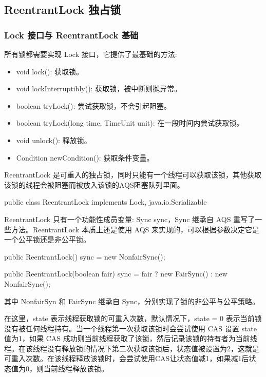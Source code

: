 \subsection{ReentrantLock 独占锁}

\subsubsection*{Lock 接口与 ReentrantLock 基础}

所有锁都需要实现 Lock 接口，它提供了最基础的方法:
\begin{itemize}
    \item void lock(): 获取锁。
    \item void lockInterruptibly(): 获取锁，被中断则抛异常。
    \item boolean tryLock(): 尝试获取锁，不会引起阻塞。
    \item boolean tryLock(long time, TimeUnit unit): 在一段时间内尝试获取锁。
    \item void unlock(): 释放锁。
    \item Condition newCondition(): 获取条件变量。
\end{itemize}

ReentrantLock 是可重入的独占锁，同时只能有一个线程可以获取该锁，其他获取该锁的线程会被阻塞而被放入该锁的AQS阻塞队列里面。

\begin{Java}
public class ReentrantLock implements Lock, java.io.Serializable
\end{Java}

ReentrantLock 只有一个功能性成员变量: Sync sync，Sync 继承自 AQS 重写了一些方法。ReentrantLock 本质上还是使用 AQS 来实现的，可以根据参数决定它是一个公平锁还是非公平锁。

\begin{Java}
public ReentrantLock() {
    sync = new NonfairSync();
}

public ReentrantLock(boolean fair) {
    sync = fair ? new FairSync() : new NonfairSync();
}
\end{Java}

其中 NonfairSyn 和 FairSync 继承自 Sync，分别实现了锁的非公平与公平策略。

在这里，state 表示线程获取锁的可重入次数，默认情况下，state = 0 表示当前锁没有被任何线程持有。当一个线程第一次获取该锁时会尝试使用 CAS 设置 state 值为1，如果 CAS 成功则当前线程获取了该锁，然后记录该锁的持有者为当前线程。在该线程没有释放锁的情况下第二次获取该锁后，状态值被设置为2，这就是可重入次数。在该线程释放该锁时，会尝试使用CAS让状态值减1，如果减1后状态值为0，则当前线程释放该锁。

